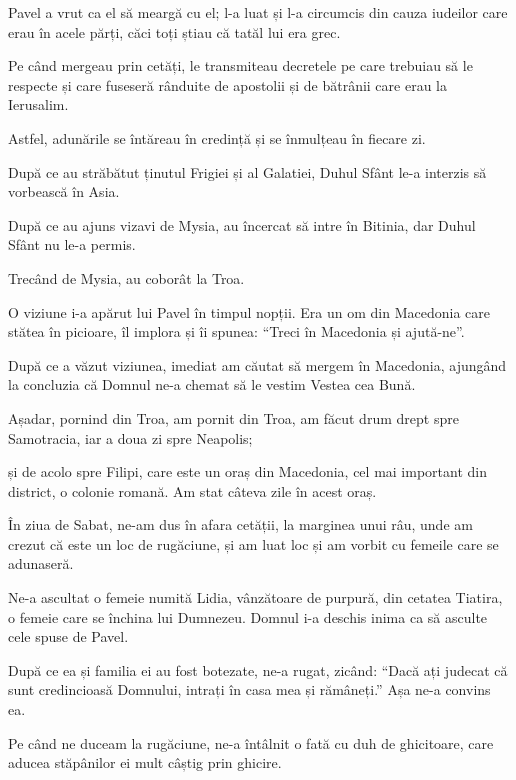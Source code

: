 {Pavel a vrut ca el să meargă cu el; l-a luat și l-a circumcis din cauza iudeilor care erau în acele părți, căci toți știau că tatăl lui era grec.

Pe când mergeau prin cetăți, le transmiteau decretele pe care trebuiau să le respecte și care fuseseră rânduite de apostolii și de bătrânii care erau la Ierusalim.

Astfel, adunările se întăreau în credință și se înmulțeau în fiecare zi.


\par }{\PP {}După ce au străbătut ținutul Frigiei și al Galatiei, Duhul Sfânt le-a interzis să vorbească în Asia.

După ce au ajuns vizavi de Mysia, au încercat să intre în Bitinia, dar Duhul Sfânt nu le-a permis.

Trecând de Mysia, au coborât la Troa.

O viziune i-a apărut lui Pavel în timpul nopții. Era un om din Macedonia care stătea în picioare, îl implora și îi spunea: “Treci în Macedonia și ajută-ne”.

După ce a văzut viziunea, imediat am căutat să mergem în Macedonia, ajungând la concluzia că Domnul ne-a chemat să le vestim Vestea cea Bună.

Așadar, pornind din Troa, am pornit din Troa, am făcut drum drept spre Samotracia, iar a doua zi spre Neapolis;

și de acolo spre Filipi, care este un oraș din Macedonia, cel mai important din district, o colonie romană. Am stat câteva zile în acest oraș.


\par }{\PP {}În ziua de Sabat, ne-am dus în afara cetății, la marginea unui râu, unde am crezut că este un loc de rugăciune, și am luat loc și am vorbit cu femeile care se adunaseră.

Ne-a ascultat o femeie numită Lidia, vânzătoare de purpură, din cetatea Tiatira, o femeie care se închina lui Dumnezeu. Domnul i-a deschis inima ca să asculte cele spuse de Pavel.

După ce ea și familia ei au fost botezate, ne-a rugat, zicând: “Dacă ați judecat că sunt credincioasă Domnului, intrați în casa mea și rămâneți.” Așa ne-a convins ea.


\par }{\PP {}Pe când ne duceam la rugăciune, ne-a întâlnit o fată cu duh de ghicitoare, care aducea stăpânilor ei mult câștig prin ghicire.

}

